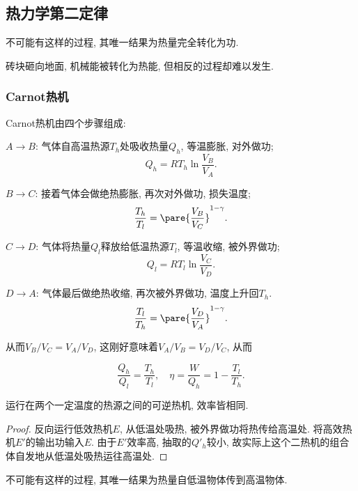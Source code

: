 \documentclass[../Thermal.tex]{subfiles}
\begin{document}
\subsection{热力学第二定律}
\begin{finale}
\begin{axiom}[热力学第二定律]
\label{ax:thermalII}
不可能有这样的过程, 其唯一结果为热量完全转化为功.
\end{axiom}
\end{finale}
\begin{ex}
砖块砸向地面, 机械能被转化为热能, 但相反的过程却难以发生.
\end{ex}
\subsubsection{Carnot热机}
Carnot热机由四个步骤组成:
\begin{cenum}
\item $A\rightarrow B$: 气体自高温热源$T_h$处吸收热量$Q_h$, 等温膨胀, 对外做功;
\[ Q_h = RT_h\ln\frac{V_B}{V_A}. \]
\item $B\rightarrow C$: 接着气体会做绝热膨胀, 再次对外做功, 损失温度;
\[ \frac{T_h}{T_l} = \pare{\frac{V_B}{V_C}}^{1-\gamma}. \]
\item $C\rightarrow D$: 气体将热量$Q_l$释放给低温热源$T_l$, 等温收缩, 被外界做功;
\[ Q_l = RT_l\ln\frac{V_C}{V_D}. \]
\item $D\rightarrow A$: 气体最后做绝热收缩, 再次被外界做功, 温度上升回$T_h$.
\[ \frac{T_l}{T_h} = \pare{\frac{V_D}{V_A}}^{1-\gamma}. \]
\end{cenum}
从而$V_B/V_C=V_A/V_D$, 这刚好意味着$V_A/V_B=V_D/V_C$, 从而
\begin{finale}
\[ \frac{Q_h}{Q_l}=\frac{T_h}{T_l},\quad \eta = \frac{W}{Q_h} = 1 - \frac{T_l}{T_h}. \]
\end{finale}
\begin{corollary}[Carnot定理]
运行在两个一定温度的热源之间的可逆热机, 效率皆相同.
\end{corollary}
\begin{proof}
反向运行低效热机$E$, 从低温处吸热, 被外界做功将热传给高温处. 将高效热机$E'$的输出功输入$E$. 由于$E'$效率高, 抽取的$Q'_h$较小, 故实际上这个二热机的组合体自发地从低温处吸热运往高温处.
\end{proof}
\begin{finale}
\begin{corollary}[热力学第二定律]
\label{coll:thermalII}
不可能有这样的过程, 其唯一结果为热量自低温物体传到高温物体.
\end{corollary}
\end{finale}
\end{document}
